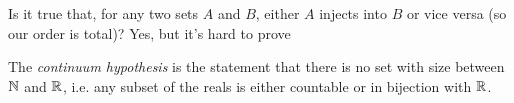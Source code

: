 \documentclass{../../template/note}
\begin{document}
    \begin{remark*}
        Is it true that, for any two sets \(A\) and \(B\), either \(A\) injects into \(B\) or vice versa (so our order is total)? Yes, but it's hard to prove
    \end{remark*}
    
    \begin{remark*}
        The \emph{continuum hypothesis} is the statement that there is no set with size between \(\mathbb N\) and \(\mathbb R\), i.e. any subset of the reals is either countable or in bijection with \(\mathbb R\).
    \end{remark*}
    
    
    
    
\end{document}
